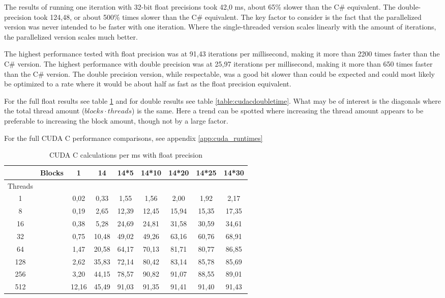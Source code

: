 The results of running one iteration with 32-bit float precisions took 42,0 ms, about 65\% slower than the C\# equivalent.
The double-precision took 124,48, or about 500\% times slower than the C\# equivalent.
The key factor to consider is the fact that the parallelized version was never intended to be faster with one iteration.
Where the single-threaded version scales linearly with the amount of iterations, the parallelized version scales much better.

The highest performance tested with float precision was at 91,43 iterations per millisecond, making it more than 2200 times faster than the C\# version.
The highest performance with double precision was at 25,97 iterations per millisecond, making it more than 650 times faster than the C\# version.
The double precision version, while respectable, was a good bit slower than could be expected and could most likely be optimized to a rate where it would be about half as fast as the float precision equivalent.

For the full float results see table \ref{table:cudacfloattime} and for double results see table \ref{table:cudacdoubletime}.
What may be of interest is the diagonals where the total thread amount ($blocks \cdot threads$) is the same.
Here a trend can be spotted where increasing the thread amount appears to be preferable to increasing the block amount, though not by a large factor.

For the full CUDA C performance comparisons, see appendix \ref{app:cuda_runtimes}


\begin{table}[h!]
\centering
\begin{tabular}{ | c | c | c | c | c | c | c | c | c | }
  \hline
           & Blocks &  1    &   14  & 14*5  & 14*10 & 14*20 & 14*25 & 14*30 \\ \hline
  Threads  &        &       &       &       &       &       &       &       \\ \hline
  1        &        & 0,02  & 0,33  & 1,55  & 1,56  & 2,00  & 1,92  & 2,17  \\ \hline
  8        &        & 0,19  & 2,65  & 12,39 & 12,45 & 15,94 & 15,35 & 17,35 \\ \hline
  16       &        & 0,38  & 5,28  & 24,69 & 24,81 & 31,58 & 30,59 & 34,61 \\ \hline
  32       &        & 0,75  & 10,48 & 49,02 & 49,26 & 63,16 & 60,76 & 68,91 \\ \hline
  64       &        & 1,47  & 20,58 & 64,17 & 70,13 & 81,71 & 80,77 & 86,85 \\ \hline
  128      &        & 2,62  & 35,83 & 72,14 & 80,42 & 83,14 & 85,78 & 85,69 \\ \hline
  256      &        & 3,20  & 44,15 & 78,57 & 90,82 & 91,07 & 88,55 & 89,01 \\ \hline
  512      &        & 12,16 & 45,49 & 91,03 & 91,35 & 91,41 & 91,40 & 91,43 \\ \hline
\end{tabular}
\caption{CUDA C calculations per ms with float precision\label{table:cudacfloattime}}
\end{table}


